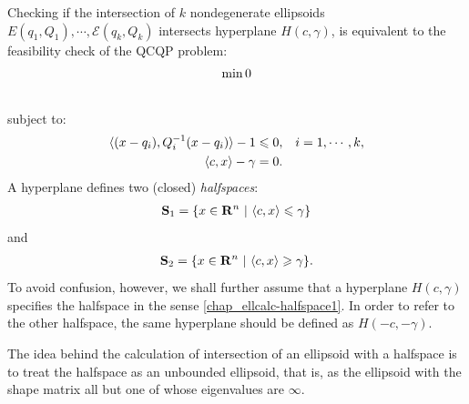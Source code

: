 \documentclass[letterpaper,10pt,english]{sphinxmanual}
\begin{document}
Checking if the intersection of $k$ nondegenerate ellipsoids
$E(q_1,Q_1),\cdots,{\mathcal E}(q_k,Q_k)$ intersects hyperplane
$H(c,\gamma)$, is equivalent to the feasibility check of the QCQP
problem:
\begin{gather}
\begin{split}\min 0\end{split}\notag\\\begin{split}\end{split}\notag
\end{gather}
subject to:
\begin{gather}
\begin{split}\begin{aligned}
\langle (x-q_i),Q_i^{-1}(x-q_i)\rangle - 1 \leqslant0, & & i=1,\cdots,k,\\
\langle c, x\rangle - \gamma = 0. & &\end{aligned}\end{split}\notag
\end{gather}
A hyperplane defines two (closed) \emph{halfspaces}:
\label{chap_ellcalc:equation-halfspace1}\begin{gather}
\begin{split}{\bf S}_1 = \{x\in{\bf R}^n ~|~ \langle c, x\rangle \leqslant\gamma\}\end{split}\label{chap_ellcalc-halfspace1}
\end{gather}
and
\label{chap_ellcalc:equation-halfspace2}\begin{gather}
\begin{split}{\bf S}_2 = \{x\in{\bf R}^n ~|~ \langle c, x\rangle \geqslant\gamma\}.\end{split}\label{chap_ellcalc-halfspace2}
\end{gather}
To avoid confusion, however, we shall further assume that a hyperplane
$H(c,\gamma)$ specifies the halfspace in the sense \eqref{chap_ellcalc-halfspace1}.
In order to refer to the other halfspace, the same hyperplane should be
defined as $H(-c,-\gamma)$.

The idea behind the calculation of intersection of an ellipsoid with a
halfspace is to treat the halfspace as an unbounded ellipsoid, that is,
as the ellipsoid with the shape matrix all but one of whose eigenvalues
are $\infty$.
\end{document}
